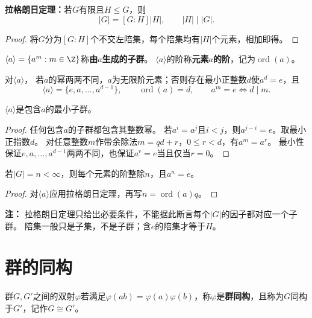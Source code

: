 \begin{theorem}
\textbf{拉格朗日定理：}若$G$有限且$H\leq G$，则
\[
|G|=[G:H]|H|,\qquad |H|\mid|G|.
\]
\end{theorem}
\begin{proof}
将$G$分为$[G:H]$个不交左陪集，每个陪集均有$|H|$个元素，相加即得。
\end{proof}

\begin{definition}
$\langle a\rangle=\{a^m:m\in\Z\}$称\textbf{由$a$生成的子群}。
$\langle a\rangle$的阶称\textbf{元素$a$的阶}，记为$\operatorname{ord}(a)$。
\end{definition}

\begin{proposition}
对$\langle a\rangle$，
若$a$的幂两两不同，$a$为无限阶元素；否则存在最小正整数$d$使$a^d=e$，且
\[
\langle a\rangle=\{e,a,\ldots,a^{d-1}\},\qquad \operatorname{ord}(a)=d,
\qquad a^m=e\iff d\mid m.
\]

$\langle a\rangle$是包含$a$的最小子群。
\end{proposition}
\begin{proof}
任何包含$a$的子群都包含其整数幂。
若$a^i=a^j$且$i<j$，则$a^{j-i}=e$。取最小正指数$d$。
对任意整数$m$作带余除法$m=qd+r$，$0\leq r<d$，有$a^m=a^r$。
最小性保证$e,a,\ldots,a^{d-1}$两两不同，也保证$a^r=e$当且仅当$r=0$。
\end{proof}

\begin{corollary}
若$|G|=n<\infty$，则每个元素的阶整除$n$，且$a^n=e$。
\end{corollary}
\begin{proof}
对$\langle a\rangle$应用拉格朗日定理，再写$n=\operatorname{ord}(a)q$。
\end{proof}

\textbf{注：}
拉格朗日定理只给出必要条件，不能据此断言每个$|G|$的因子都对应一个子群。
陪集一般只是子集，不是子群；含$e$的陪集才等于$H$。


\section{群的同构}
\begin{definition}
群$G,G'$之间的双射$\varphi$若满足$\varphi(ab)=\varphi(a)\varphi(b)$，称$\varphi$是\textbf{群同构}，且称为$G$同构于$G'$，记作$G\cong G'$。
\end{definition}

